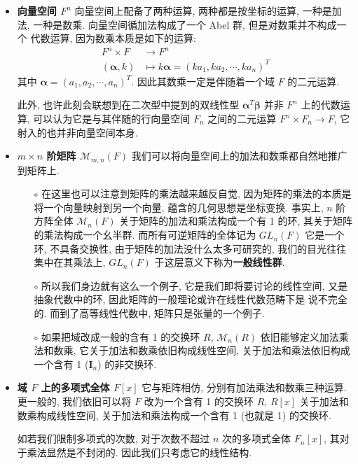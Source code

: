 \documentclass[UTF8]{book}
\begin{document}
\begin{itemize}
    \item \textbf{向量空间 $F^n$} 向量空间上配备了两种运算, 
    两种都是按坐标的运算, 一种是加法, 一种是数乘. 
    向量空间循加法构成了一个 Abel 群, 但是对数乘并不构成一个
    代数运算, 因为数乘本质是如下的运算: 
    $$ \begin{aligned}
        F^n \times F &\to F^n \\
        (\boldsymbol{\alpha},k) &\mapsto k\boldsymbol{\alpha}
        = (ka_1,ka_2,\cdots,ka_n)^T
    \end{aligned} $$
    其中 $\boldsymbol{\alpha} = (a_1,a_2,\cdots,a_n)^T$. 
    因此其数乘一定是伴随着一个域 $F$ 的二元运算. 

    此外, 也许此刻会联想到在二次型中提到的双线性型 
    $ \boldsymbol{\alpha} ^T\boldsymbol{\beta}$ 
    并非 $F^n$ 上的代数运算, 
    可以认为它是与其伴随的行向量空间 $F_n$ 之间的二元运算 
    $F^n \times F_n \to F$, 它射入的也并非向量空间本身. 

    \item \textbf{$m\times n$ 阶矩阵 $\mathcal{M}_{m,n}(F)$} 
    我们可以将向量空间上的加法和数乘都自然地推广到矩阵上. 
    
    \begin{itemize}
        \item[$\circ$] 在这里也可以注意到矩阵的乘法越来越反自觉, 
        因为矩阵的乘法的本质是将一个向量映射到另一个向量, 
        蕴含的几何思想是坐标变换. 
        事实上, $n$ 阶方阵全体 $\mathcal{M}_{n}(F)$ 
        关于矩阵的加法和乘法构成一个有 1 的环, 
        其关于矩阵的乘法构成一个幺半群. 
        而所有可逆矩阵的全体记为 $GL_n(F)$ 它是一个环, 不具备交换性, 
        由于矩阵的加法没什么太多可研究的, 我们的目光往往集中在其乘法上, 
        $GL_n(F)$ 于这层意义下称为\textbf{一般线性群}. 

        \item[$\circ$]  所以我们身边就有这么一个例子, 它是我们即将要讨论的线性空间, 
        又是抽象代数中的环, 因此矩阵的一般理论或许在线性代数范畴下是
        说不完全的. 而到了高等线性代数中, 矩阵只是张量的一个例子. 

        \item[$\circ$] 如果把域改成一般的含有 1 的交换环 $R$, 
        $\mathcal{M}_n(R)$ 依旧能够定义加法乘法和数乘, 
        它关于加法和数乘依旧构成线性空间, 
        关于加法和乘法依旧构成一个含有 1 ($\boldsymbol{I}_n$) 的非交换环. 
    \end{itemize}

    \item \textbf{域 $F$ 上的多项式全体 $F[x]$} 
    它与矩阵相仿, 分别有加法乘法和数乘三种运算. 
    更一般的, 我们依旧可以将 $F$ 改为一个含有 1 的交换环 $R$, 
    $R[x]$ 关于加法和数乘构成线性空间, 
    关于加法和乘法构成一个含有 1 (也就是 1) 的交换环. 

    如若我们限制多项式的次数, 对于次数不超过 $n$ 次的多项式全体 $F_n[x]$, 
    其对于乘法显然是不封闭的. 
    因此我们只考虑它的线性结构. 
\end{itemize}
\end{document}
